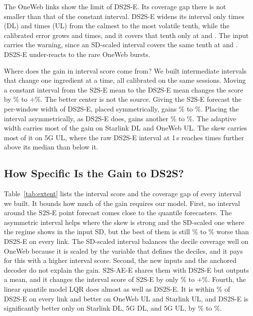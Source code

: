 The OneWeb links show the limit of DS2S-E. Its coverage gap there is not smaller than that of the constant interval. DS2S-E widens its interval only \WidRatioOWDL{} times (DL) and \WidRatioOWUL{} times (UL) from the calmest to the most volatile tenth, while the calibrated error grows \ErrRatioOWDL{} and \ErrRatioOWUL{} times, and it covers that tenth only at \CovDSOWDLdTen{} and \CovDSOWULdTen{}. The input carries the warning, since an SD-scaled interval covers the same tenth at \CovNormTunedOWDLdTen{} and \CovNormTunedOWULdTen. DS2S-E under-reacts to the rare OneWeb bursts.

Where does the gain in interval score come from? We built intermediate intervals that change one ingredient at a time, all calibrated on the same sessions. Moving a constant interval from the S2S-E mean to the DS2S-E mean changes the score by \DecCentreLo\% to $+$\DecCentreHi\%. The better center is not the source. Giving the S2S-E forecast the per-window width of DS2S-E, placed symmetrically, gains \DecWidthLoAbs\% to \DecWidthHiAbs\%. Placing the interval asymmetrically, as DS2S-E does, gains another \DecAsymLoAbs\% to \DecAsymHiAbs\%. The adaptive width carries most of the gain on Starlink DL and OneWeb UL. The skew carries most of it on 5G UL, where the raw DS2S-E interval at 1\,s reaches \AsymQULratio{} times further above its median than below it.

\subsection{How Specific Is the Gain to DS2S?}
Table~\ref{tab:extent} lists the interval score and the coverage gap of every interval we built. It bounds how much of the gain requires our model. First, no interval around the S2S-E point forecast comes close to the quantile forecasters. The asymmetric interval helps where the skew is strong and the SD-scaled one where the regime shows in the input SD, but the best of them is still \ExtBestPointLoAbs\% to \ExtBestPointHiAbs\% worse than DS2S-E on every link. The SD-scaled interval balances the decile coverage well on OneWeb because it is scaled by the variable that defines the deciles, and it pays for this with a higher interval score. Second, the new inputs and the anchored decoder do not explain the gain. S2S-AE-E shares them with DS2S-E but outputs a mean, and it changes the interval score of S2S-E by only \ExtFrfullLo\% to $+$\ExtFrfullHi\%. \GaussSentence{} Fourth, the linear quantile model LQR does almost as well as DS2S-E. It is within \ExtLQRMaxAbs\% of DS2S-E on every link and better on OneWeb UL and Starlink UL, and DS2S-E is significantly better only on Starlink DL, 5G DL, and 5G UL, by \LQRsigLo\% to \LQRsigHi\%.

